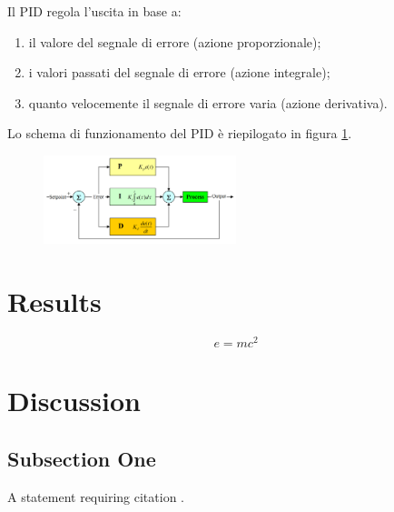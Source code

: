\documentclass[twoside,twocolumn]{article}
\begin{document}
Il PID regola l'uscita in base a:
\begin{enumerate}
	\item il valore del segnale di errore (azione proporzionale);
	\item i valori passati del segnale di errore (azione integrale);
	\item quanto velocemente il segnale di errore varia (azione derivativa).
\end{enumerate}

Lo schema di funzionamento del PID è riepilogato  in figura \ref{fig:pid}.

\begin{figure}[h]
	\centering
	\includegraphics[width=0.5\textwidth]{immagini/PID}
	\caption{}
	\label{fig:pid}
\end{figure}








\section{Results}


\blindtext %

\begin{equation}
\label{eq:emc}
e = mc^2
\end{equation}

\blindtext %


\section{Discussion}

\subsection{Subsection One}

A statement requiring citation \cite{Figueredo:2009dg}.
\blindtext %
\end{document}
